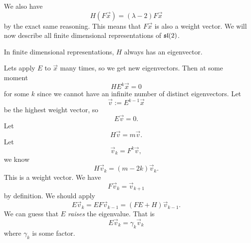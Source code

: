 We also have
\begin{equation}
H(F\vec{x})=(\lambda-2)F\vec{x}
\end{equation}
by the exact same reasoning. This means that $F\vec{x}$ is also a
weight vector. We will now describe all finite dimensional
representations of $\frak{sl}(2)$.

\begin{rmk}
In finite dimensional representations, $H$ always has an eigenvector.
\end{rmk}

Lets apply $E$ to $\vec{x}$ many times, so we get new
eigenvectors. Then at some moment
\begin{equation}
HE^{k}\vec{x}=0
\end{equation}
for some $k$ since we cannot have an infinite number of distinct
eigenvectors. Let
\begin{equation}
\vec{v}:=E^{k-1}\vec{x}
\end{equation}
be the highest weight vector, so
\begin{equation}
E\vec{v}=0.
\end{equation}
Let
\begin{equation}
H\vec{v}=m\vec{v}.
\end{equation}
Let
\begin{equation}
\vec{v}_{k}=F^{k}\vec{v},
\end{equation}
we know
\begin{equation}
H\vec{v}_{k}=(m-2k)\vec{v}_{k}.
\end{equation}
This is a weight vector. We have
\begin{equation}
F\vec{v}_{k}=\vec{v}_{k+1}
\end{equation}
by definition. We should apply
\begin{equation}
E\vec{v}_{k}=EF\vec{v}_{k-1}=(FE+H)\vec{v}_{k-1}.
\end{equation}
We can guess that $E$ \emph{raises} the eigenvalue. That is
\begin{equation}
E\vec{v}_{k}=\gamma_{k}\vec{v}_{k}
\end{equation}
where $\gamma_{k}$ is some factor.

